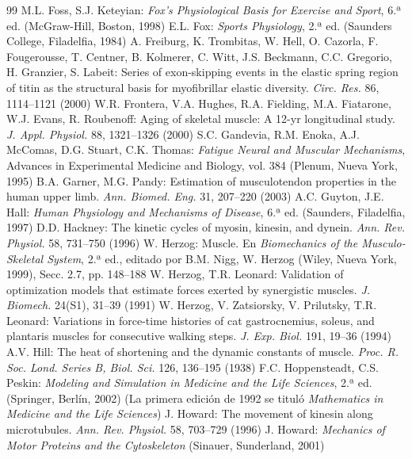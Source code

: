 \documentclass[12pt]{book}
\begin{document}
\begin{thebibliography}{99}
   M.L. Foss, S.J. Keteyian: \textit{Fox's Physiological Basis for Exercise and Sport}, 6.ª ed. (McGraw-Hill, Boston, 1998)
   E.L. Fox: \textit{Sports Physiology}, 2.ª ed. (Saunders College, Filadelfia, 1984)
   A. Freiburg, K. Trombitas, W. Hell, O. Cazorla, F. Fougerousse, T. Centner, B. Kolmerer, C. Witt, J.S. Beckmann, C.C. Gregorio, H. Granzier, S. Labeit: Series of exon-skipping events in the elastic spring region of titin as the structural basis for myofibrillar elastic diversity. \textit{Circ. Res.} 86, 1114--1121 (2000)
   W.R. Frontera, V.A. Hughes, R.A. Fielding, M.A. Fiatarone, W.J. Evans, R. Roubenoff: Aging of skeletal muscle: A 12-yr longitudinal study. \textit{J. Appl. Physiol.} 88, 1321--1326 (2000)
   S.C. Gandevia, R.M. Enoka, A.J. McComas, D.G. Stuart, C.K. Thomas: \textit{Fatigue Neural and Muscular Mechanisms}, Advances in Experimental Medicine and Biology, vol. 384 (Plenum, Nueva York, 1995)
   B.A. Garner, M.G. Pandy: Estimation of musculotendon properties in the human upper limb. \textit{Ann. Biomed. Eng.} 31, 207--220 (2003)
   A.C. Guyton, J.E. Hall: \textit{Human Physiology and Mechanisms of Disease}, 6.ª ed. (Saunders, Filadelfia, 1997)
   D.D. Hackney: The kinetic cycles of myosin, kinesin, and dynein. \textit{Ann. Rev. Physiol.} 58, 731--750 (1996)
   W. Herzog: Muscle. En \textit{Biomechanics of the Musculo-Skeletal System}, 2.ª ed., editado por B.M. Nigg, W. Herzog (Wiley, Nueva York, 1999), Secc. 2.7, pp. 148--188
   W. Herzog, T.R. Leonard: Validation of optimization models that estimate forces exerted by synergistic muscles. \textit{J. Biomech.} 24(S1), 31--39 (1991)
   W. Herzog, V. Zatsiorsky, V. Prilutsky, T.R. Leonard: Variations in force-time histories of cat gastrocnemius, soleus, and plantaris muscles for consecutive walking steps. \textit{J. Exp. Biol.} 191, 19--36 (1994)
   A.V. Hill: The heat of shortening and the dynamic constants of muscle. \textit{Proc. R. Soc. Lond. Series B, Biol. Sci.} 126, 136--195 (1938)
   F.C. Hoppensteadt, C.S. Peskin: \textit{Modeling and Simulation in Medicine and the Life Sciences}, 2.ª ed. (Springer, Berlín, 2002) (La primera edición de 1992 se tituló \textit{Mathematics in Medicine and the Life Sciences})
   J. Howard: The movement of kinesin along microtubules. \textit{Ann. Rev. Physiol.} 58, 703--729 (1996)
   J. Howard: \textit{Mechanics of Motor Proteins and the Cytoskeleton} (Sinauer, Sunderland, 2001)

\end{thebibliography}
\end{document}
